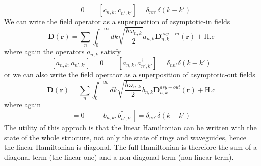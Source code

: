 \documentclass[12pt]{book}
\renewcommand{\r}{\mathbf{r}}
\begin{document}
\begin{equation}[c_{n,k},c_{n',k'}] = 0 \qquad [c_{n,k},c_{n',k'}^\dagger] = \delta_{nn'}\delta(k-k')\end{equation}
We can write the field operator as a superposition of asymptotic-in fields
\begin{equation}\label{dasyin}\mathbf{D}(\r) = \sum_n \int_{0}^{+\infty}dk \sqrt{\frac{\hbar \omega_{n,k}}{2}}a_{n,k}\mathbf{D}_{n,k}^{asy-in}(\r) + \text{H.c}\end{equation}
where again the operators $a_{n,k}$ satisfy
\begin{equation}\label{acommutator}[a_{n,k},a_{n',k'}] = 0 \qquad [a_{n,k},a_{n',k'}^\dagger] = \delta_{nn'}\delta(k-k')\end{equation}
or we can also write the field operator as a superposition of asymptotic-out fields
\begin{equation}\label{dasyout}\mathbf{D}(\r) = \sum_n \int_{0}^{+\infty}dk \sqrt{\frac{\hbar \omega_{n,k}}{2}}b_{n,k}\mathbf{D}_{n,k}^{asy-out}(\r) + \text{H.c}\end{equation}
where again
\begin{equation}[b_{n,k},b_{n',k'}] = 0 \qquad [b_{n,k},b_{n',k'}^\dagger] = \delta_{nn'}\delta(k-k')\end{equation}
The utility of this approch is that the linear Hamiltonian can be written with the state of the whole structure, not only the state of rings and waveguides, hence the linear Hamiltonian is diagonal. The full Hamiltonian is therefore the sum of a diagonal term (the linear one) and a non diagonal term (non linear term).
\end{document}
